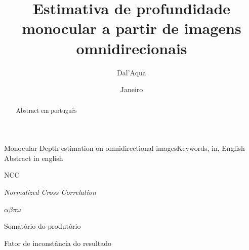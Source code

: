 \documentclass[cic,tc]{iiufrgs}
\title{Estimativa de profundidade monocular a partir de imagens omnidirecionais}
\author{Dal'Aqua}{Lorenzo Pezzi}
\date{Janeiro}{11, 2018}
\begin{document}
\maketitle





\begin{abstract}
    Abstract em português
\end{abstract}

\begin{englishabstract}{Monocular Depth estimation on omnidirectional images}{Keywords, in, English}
    Abstract in english
\end{englishabstract}

\listoffigures

\listoftables

\begin{listofabbrv}{NCC}
    \item[NCC] \textit{Normalized Cross Correlation}
\end{listofabbrv}

\begin{listofsymbols}{$\alpha\beta\pi\omega$}
    \item[$\sum{\frac{a}{b}}$] Somatório do produtório
    \item[$\alpha\beta\pi\omega$] Fator de inconstância do resultado
\end{listofsymbols}
\end{document}
